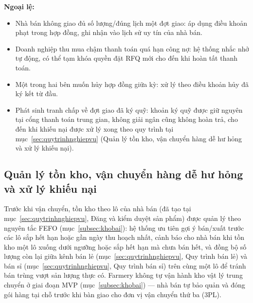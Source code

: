 \textbf{Ngoại lệ:}
\begin{itemize}
    \item Nhà bán không giao đủ số lượng/đúng lịch một đợt giao: áp dụng điều khoản phạt trong hợp đồng, ghi nhận vào lịch sử uy tín của nhà bán.
    \item Doanh nghiệp thu mua chậm thanh toán quá hạn công nợ: hệ thống nhắc nhở tự động, có thể tạm khóa quyền đặt RFQ mới cho đến khi hoàn tất thanh toán.
    \item Một trong hai bên muốn hủy hợp đồng giữa kỳ: xử lý theo điều khoản hủy đã ký kết từ đầu.
    \item Phát sinh tranh chấp về đợt giao đã ký quỹ: khoản ký quỹ được giữ nguyên tại cổng thanh toán trung gian, không giải ngân cũng không hoàn trả, cho đến khi khiếu nại được xử lý xong theo quy trình tại mục~\ref{sec:quytrinhnghiepvu} (Quản lý tồn kho, vận chuyển hàng dễ hư hỏng và xử lý khiếu nại).
\end{itemize}




\subsection{Quản lý tồn kho, vận chuyển hàng dễ hư hỏng và xử lý khiếu nại}

Trước khi vận chuyển, tồn kho theo lô của nhà bán (đã tạo tại mục~\ref{sec:quytrinhnghiepvu}, Đăng và kiểm duyệt sản phẩm) được quản lý theo nguyên tắc FEFO (mục~\ref{subsec:khobai}): hệ thống ưu tiên gợi ý bán/xuất trước các lô sắp hết hạn hoặc gần ngày thu hoạch nhất, cảnh báo cho nhà bán khi tồn kho một lô xuống dưới ngưỡng hoặc sắp hết hạn mà chưa bán hết, và đồng bộ số lượng còn lại giữa kênh bán lẻ (mục~\ref{sec:quytrinhnghiepvu}, Quy trình bán lẻ) và bán sỉ (mục~\ref{sec:quytrinhnghiepvu}, Quy trình bán sỉ) trên cùng một lô để tránh bán trùng vượt sản lượng thực có. Farmery không tự vận hành kho vật lý trung chuyển ở giai đoạn MVP (mục~\ref{subsec:khobai}) --- nhà bán tự bảo quản và đóng gói hàng tại chỗ trước khi bàn giao cho đơn vị vận chuyển thứ ba (3PL).

